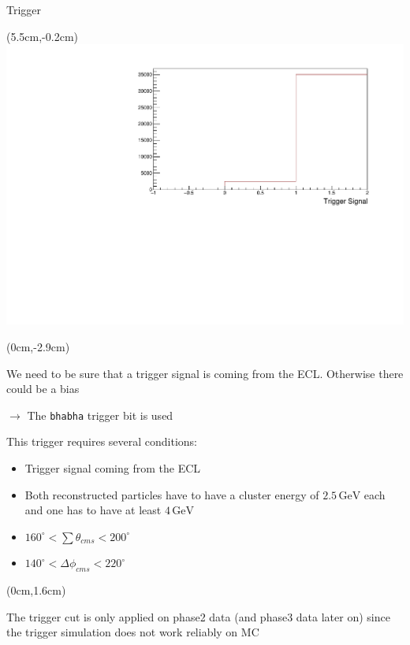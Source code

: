 \documentclass[8pt]{beamer}
\begin{document}
\begin{frame}{Trigger}
	
	\begin{textblock*}{6.5cm}(5.5cm,-0.2cm)
		\includegraphics[width=\textwidth]{VBilder/DataTrigger}
	\end{textblock*}
	
	
	
	
	
	\begin{textblock*}{10cm}(0cm,-2.9cm)
		
		We need to be sure that a trigger signal is coming from the ECL. Otherwise there could be a bias
		
		$\rightarrow$ The \texttt{bhabha} trigger bit is used
		
		This trigger requires several conditions:
		\begin{itemize}
			\item Trigger signal coming from the ECL
			\item Both reconstructed particles have to have a cluster energy of $2.5\,\textrm{GeV}$ each and one has to have at least $4\,\textrm{GeV}$
			\item $160^{\circ} < \sum \theta_{cms} < 200^{\circ}$
			\item $140^{\circ} < \Delta \phi_{cms} < 220^{\circ}$
		
		\end{itemize}
	
\end{textblock*}
	
	
	
	
	\begin{textblock*}{5.5cm}(0cm,1.6cm)
	
	The trigger cut is only applied on phase2 data (and phase3 data later on) since the trigger simulation does not work reliably on MC 
	\end{textblock*}
\end{frame}
\end{document}
